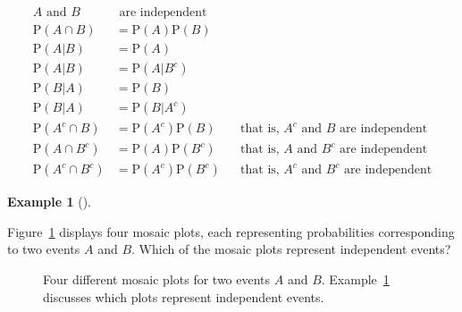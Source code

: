 \documentclass[
  letterpaper,
  DIV=11,
  numbers=noendperiod]{scrreprt}
\theoremstyle{plain}
\theoremstyle{definition}
\newtheorem{example}{Example}[chapter]
\theoremstyle{definition}
\theoremstyle{definition}
\theoremstyle{remark}
\begin{document}
\begin{align*}
\text{$A$ and $B$} & \text{ are independent} & &\\
\textrm{P}(A \cap B) & = \textrm{P}(A)\textrm{P}(B) & & \\
\textrm{P}(A|B) & = \textrm{P}(A) & & \\
\textrm{P}(A|B) & = \textrm{P}(A|B^c) & & \\
\textrm{P}(B|A) & = \textrm{P}(B) & & \\
\textrm{P}(B|A) & = \textrm{P}(B|A^c) & &\\
\textrm{P}(A^c \cap B) & = \textrm{P}(A^c)\textrm{P}(B) & & \text{that is, $A^c$ and $B$ are independent}\\
\textrm{P}(A \cap B^c) & = \textrm{P}(A)\textrm{P}(B^c) & & \text{that is, $A$ and $B^c$ are independent}\\
\textrm{P}(A^c \cap B^c) & = \textrm{P}(A^c)\textrm{P}(B^c) & & \text{that is, $A^c$ and $B^c$ are independent}
\end{align*}

\begin{tcolorbox}[enhanced jigsaw, opacityback=0, left=2mm, colframe=quarto-callout-note-color-frame, toprule=.15mm, breakable, colback=white, leftrule=.75mm, arc=.35mm, rightrule=.15mm, bottomrule=.15mm]

\begin{example}[]\protect\hypertarget{exm-independent-mosaic}{}\label{exm-independent-mosaic}

Figure~\ref{fig-independent-mosaic-plot} displays four mosaic plots,
each representing probabilities corresponding to two events \(A\) and
\(B\). Which of the mosaic plots represent independent events?

\end{example}

\end{tcolorbox}

\begin{figure}


\caption{\label{fig-independent-mosaic-plot}Four different mosaic plots
for two events \(A\) and \(B\). Example~\ref{exm-independent-mosaic}
discusses which plots represent independent events.}

\end{figure}%
\end{document}
